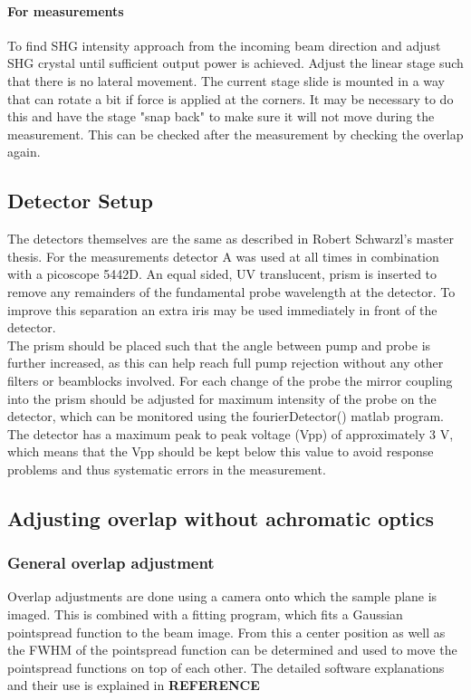 \documentclass[twoside,openright]{scrreprt}
\begin{document}
\paragraph{For measurements}
To find SHG intensity approach from the incoming beam direction and adjust SHG crystal until sufficient output power is achieved.\newline
Adjust the linear stage such that there is no lateral movement. The current stage slide is mounted in a way that can rotate a bit if force is applied at the corners. It may be necessary to do this and have the stage "snap back" to make sure it will not move during the measurement. This can be checked after the measurement by checking the overlap again.
\subsection{Detector Setup}
The detectors themselves are the same as described in Robert Schwarzl's master thesis.\cite{Schwarzl2021} For the measurements detector A was used at all times in combination with a picoscope 5442D. An equal sided, UV translucent, prism is inserted to remove any remainders of the fundamental probe wavelength at the detector. To improve this separation an extra iris may be used immediately in front of the detector.\\
The prism should be placed such that the angle between pump and probe is further increased, as this can help reach full pump rejection without any other filters or beamblocks involved. For each change of the probe the mirror coupling into the prism should be adjusted for maximum intensity of the probe on the detector, which can be monitored using the fourierDetector() matlab program.\\
The detector has a maximum peak to peak voltage (Vpp) of approximately 3 V, which means that the Vpp should be kept below this value to avoid response problems and thus systematic errors in the measurement.
\subsection{Adjusting overlap without achromatic optics}

\subsubsection{General overlap adjustment}
Overlap adjustments are done using a camera onto which the sample plane is imaged. This is combined with a fitting program, which fits a Gaussian pointspread function to the beam image. From this a center position as well as the FWHM of the pointspread function can be determined and used to move the pointspread functions on top of each other. The detailed software explanations and their use is explained in \textbf{REFERENCE}\\
\end{document}
